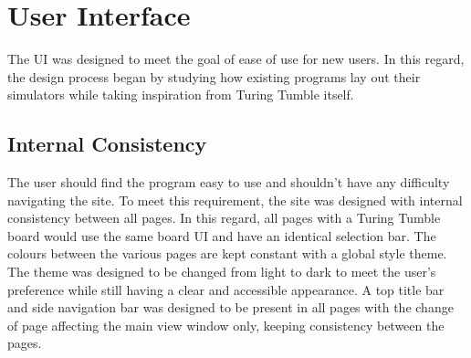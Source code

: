\documentclass{l4proj}
\begin{document}


\section{User Interface}

The UI was designed to meet the goal of ease of use for new users. In this regard, the design process began by studying how existing programs lay out their simulators while taking inspiration from Turing Tumble itself.

\subsection{Internal Consistency}
The user should find the program easy to use and shouldn't have any difficulty navigating the site. To meet this requirement, the site was designed with internal consistency between all pages. In this regard, all pages with a Turing Tumble board would use the same board UI and have an identical selection bar. The colours between the various pages are kept constant with a global style theme. The theme was designed to be changed from light to dark to meet the user's preference while still having a clear and accessible appearance. A top title bar and side navigation bar was designed to be present in all pages with the change of page affecting the main view window only, keeping consistency between the pages.
\end{document}
